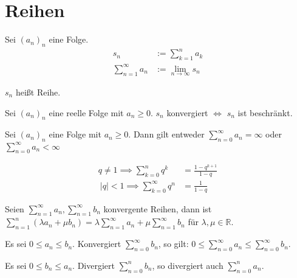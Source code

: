 \chapter{Reihen}

\begin{definition}
  Sei $(a_n)_n$ eine Folge.
  \begin{align*}
    s_n &:= \sum_{k=1}^n a_k \\
    \sum_{n=1}^{\infty} a_n &:= \lim_{n \to \infty} s_n
  \end{align*}

  $s_n$ heißt Reihe.
\end{definition}

\begin{theorem}
  Sei $(a_n)_n$ eine reelle Folge mit $a_n \ge 0$. $s_n$ konvergiert $\iff$ $s_n$ ist beschränkt.
\end{theorem}

\begin{corollary}
  Sei $(a_n)_n$ eine Folge mit $a_n \ge 0$. Dann gilt entweder $\sum_{n=0}^{\infty} a_n = \infty$ oder $\sum_{n=0}^{\infty} a_n < \infty$
\end{corollary}

\begin{lemma}
  \begin{align*}
    q \ne 1 \implies \sum_{k=0}^n q^k &= \frac{1-q^{k+1}}{1-q} \\\
    |q| < 1 \implies \sum_{k=0}^{\infty} q^n &= \frac{1}{1-q}
  \end{align*}
\end{lemma}

\begin{theorem}
  Seien $\sum_{n=1}^{\infty} a_n, \sum_{n=1}^{\infty} b_n$ konvergente Reihen, dann ist $\sum_{n=1}^n (\lambda a_n + \mu b_n) = \lambda \sum_{n=1}^{\infty} a_n + \mu \sum_{n=1}^{\infty} b_n$ für $\lambda, \mu \in \mathbb{R}$.
\end{theorem}

\begin{theorem}[Majorantemkriterium]
  Es sei $0 \le a_n \le b_n$. Konvergiert $\sum_{n=0}^{\infty} b_n$, so gilt: $0 \le \sum_{n=0}^{\infty} a_n \le \sum_{n=0}^{\infty} b_n$.
\end{theorem}

\begin{theorem}[Minorantemkriterium]
  Es sei $0 \le b_n \le a_n$. Divergiert $\sum_{n=0}^n b_n$, so divergiert auch $\sum_{n=0}^n a_n$.
\end{theorem}


